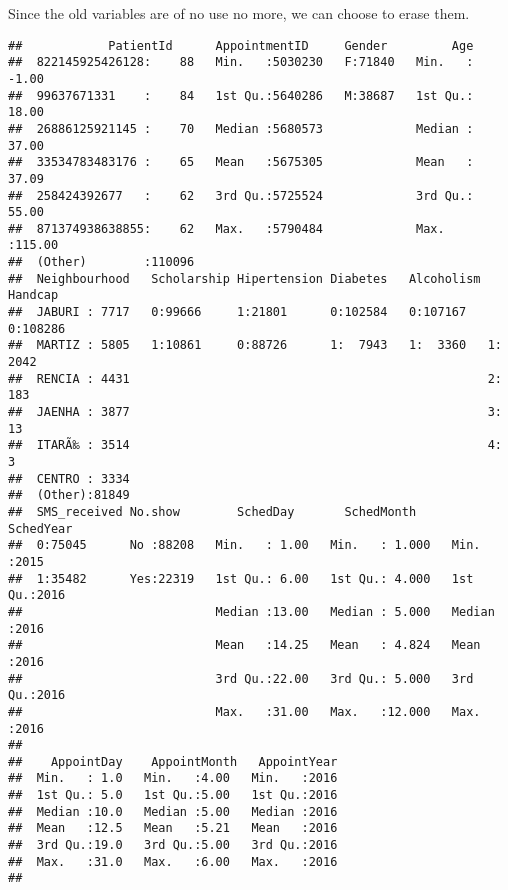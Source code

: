 \documentclass[]{article}
\newenvironment{Shaded}{\begin{snugshade}}{\end{snugshade}}
\newcommand{\KeywordTok}[1]{\textcolor[rgb]{0.13,0.29,0.53}{\textbf{#1}}}
\newcommand{\StringTok}[1]{\textcolor[rgb]{0.31,0.60,0.02}{#1}}
\newcommand{\OtherTok}[1]{\textcolor[rgb]{0.56,0.35,0.01}{#1}}
\newcommand{\OperatorTok}[1]{\textcolor[rgb]{0.81,0.36,0.00}{\textbf{#1}}}
\newcommand{\NormalTok}[1]{#1}
\begin{document}
Since the old variables are of no use no more, we can choose to erase
them.

\begin{Shaded}
\end{Shaded}

\begin{verbatim}
##            PatientId      AppointmentID     Gender         Age        
##  822145925426128:    88   Min.   :5030230   F:71840   Min.   : -1.00  
##  99637671331    :    84   1st Qu.:5640286   M:38687   1st Qu.: 18.00  
##  26886125921145 :    70   Median :5680573             Median : 37.00  
##  33534783483176 :    65   Mean   :5675305             Mean   : 37.09  
##  258424392677   :    62   3rd Qu.:5725524             3rd Qu.: 55.00  
##  871374938638855:    62   Max.   :5790484             Max.   :115.00  
##  (Other)        :110096                                               
##  Neighbourhood   Scholarship Hipertension Diabetes   Alcoholism Handcap   
##  JABURI : 7717   0:99666     1:21801      0:102584   0:107167   0:108286  
##  MARTIZ : 5805   1:10861     0:88726      1:  7943   1:  3360   1:  2042  
##  RENCIA : 4431                                                  2:   183  
##  JAENHA : 3877                                                  3:    13  
##  ITARÃ‰ : 3514                                                  4:     3  
##  CENTRO : 3334                                                            
##  (Other):81849                                                            
##  SMS_received No.show        SchedDay       SchedMonth       SchedYear   
##  0:75045      No :88208   Min.   : 1.00   Min.   : 1.000   Min.   :2015  
##  1:35482      Yes:22319   1st Qu.: 6.00   1st Qu.: 4.000   1st Qu.:2016  
##                           Median :13.00   Median : 5.000   Median :2016  
##                           Mean   :14.25   Mean   : 4.824   Mean   :2016  
##                           3rd Qu.:22.00   3rd Qu.: 5.000   3rd Qu.:2016  
##                           Max.   :31.00   Max.   :12.000   Max.   :2016  
##                                                                          
##    AppointDay    AppointMonth   AppointYear  
##  Min.   : 1.0   Min.   :4.00   Min.   :2016  
##  1st Qu.: 5.0   1st Qu.:5.00   1st Qu.:2016  
##  Median :10.0   Median :5.00   Median :2016  
##  Mean   :12.5   Mean   :5.21   Mean   :2016  
##  3rd Qu.:19.0   3rd Qu.:5.00   3rd Qu.:2016  
##  Max.   :31.0   Max.   :6.00   Max.   :2016  
## 
\end{verbatim}
\end{document}
